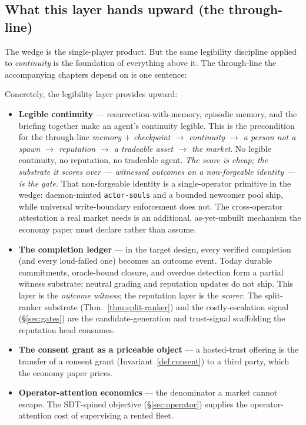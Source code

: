 \documentclass[11pt,a4paper]{article}
\theoremstyle{definition}
\theoremstyle{plain}
\begin{document}
\subsection{What this layer hands upward (the through-line)}\label{sec:handoff}

The wedge is the single-player product. But the same legibility discipline applied to
\emph{continuity} is the foundation of everything above it. The through-line
the accompanying chapters depend on is one sentence:


Concretely, the legibility layer provides upward:
\begin{itemize}[leftmargin=1.2em]
\item \textbf{Legible continuity} --- resurrection-with-memory, episodic memory, and
the briefing together make an agent's continuity legible. This is the precondition for
the through-line \emph{memory $+$ checkpoint $\to$ continuity $\to$ a person not a
spawn $\to$ reputation $\to$ a tradeable asset $\to$ the market}. No legible
continuity, no reputation, no tradeable agent. \emph{The score is cheap; the substrate
it scores over --- witnessed outcomes on a non-forgeable identity --- is the gate.}
That non-forgeable identity is a \BuiltWeak{} single-operator primitive in the
wedge: daemon-minted \texttt{actor-souls} and a bounded newcomer pool ship, while universal
write-boundary enforcement does not. The
cross-operator attestation a real market needs is an additional, as-yet-unbuilt
mechanism the economy paper must declare rather than assume.
\item \textbf{The completion ledger} --- in the target design, every verified
completion (and every loud-failed one) becomes an outcome event. Today durable
commitments, oracle-bound closure, and overdue detection form a partial witness
substrate; neutral grading and reputation updates do not ship. This layer is the \emph{outcome witness}; the
reputation layer is the \emph{scorer}. The split-ranker substrate
(Thm.~\ref{thm:split-ranker}) and the costly-escalation signal (\S\ref{sec:gates})
are the candidate-generation and trust-signal scaffolding the reputation head consumes.
\item \textbf{The consent grant as a priceable object} --- a hosted-trust offering is
the transfer of a consent grant (Invariant~\ref{def:consent}) to a third party, which the
economy paper prices.
\item \textbf{Operator-attention economics} --- the denominator a market cannot
escape. The SDT-spined objective (\S\ref{sec:operator}) supplies the
operator-attention cost of supervising a rented fleet.
\end{itemize}
\end{document}
